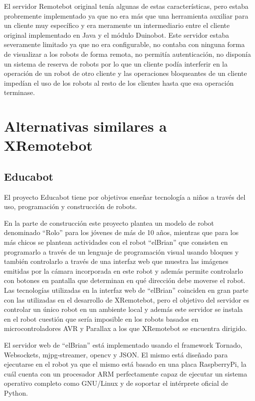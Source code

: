 El servidor Remotebot original tenía algunas de estas características, pero
estaba probremente implementado ya que no era más que una herramienta auxiliar
para un cliente muy específico y era meramente un intermediario entre el
cliente original implementado en Java y el módulo Duinobot. Este servidor
estaba severamente limitado
ya que no era configurable, no contaba con ninguna forma de visualizar a los
robots de forma remota, no permitía autenticación, no disponía un sistema
de reserva de robots por lo que un cliente podía interferir en la operación
de un robot de otro cliente y las operaciones bloqueantes de un cliente
impedían el uso de los robots al resto de los clientes hasta que esa operación
terminase.

\section{Alternativas similares a XRemotebot}

\subsection{Educabot}

El proyecto Educabot tiene por objetivos enseñar tecnología a niños a través
del uso, programación y construcción de robots.

En la parte de construcción este proyecto plantea un modelo de robot denominado
``Rolo'' para los jóvenes de más de 10 años, mientras que para los más chicos
se plantean actividades con el robot ``elBrian'' que consisten en programarlo
a través de un lenguaje de programación visual usando bloques y también
controlarlo a través de una interfaz web que muestra las imágenes emitidas
por la cámara incorporada en este robot y además permite controlarlo con
botones en pantalla que determinan en qué dirección debe moverse el robot.
Las tecnologías utilizadas en la interfaz web de ``elBrian'' coinciden en gran
parte con las utilizadas en el desarrollo de XRemotebot, pero el objetivo del
servidor es controlar un único robot en un ambiente local y además este servidor
se instala en el robot cuestión que sería imposible en los robots basados en
microcontroladores AVR y Parallax a los que XRemotebot se encuentra dirigido.

El servidor web de ``elBrian'' está implementado usando el framework Tornado,
Websockets, mjpg-streamer, opencv y JSON. El mismo está diseñado para ejecutarse
en el robot ya que el mismo está basado en una placa RaspberryPi, la cuál
cuenta con un procesador ARM perfectamente capaz de ejecutar un sistema
operativo completo como GNU/Linux y de soportar el intérprete oficial de Python.

